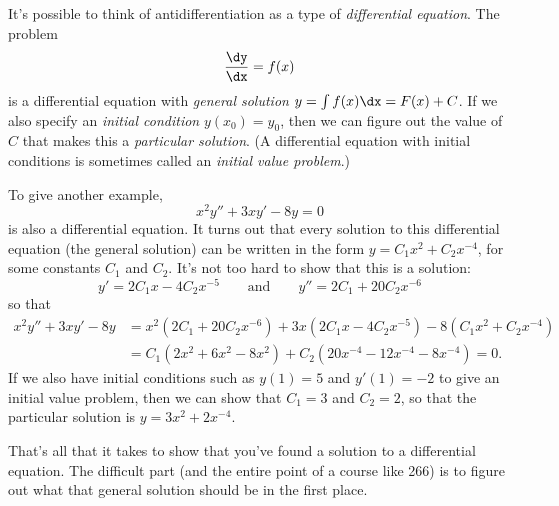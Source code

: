 

It's possible to think of antidifferentiation as a type of
\emph{differential equation}.  The problem
\[\frac\dy\dx=f(x)\]
is a differential equation with \emph{general solution}
$y=\int f(x)\dx=F(x)+C$.
If we also specify an \emph{initial condition} $y(x_0)=y_0$, then we can figure
out the value of $C$ that makes this a \emph{particular solution}.
(A differential equation with initial conditions is sometimes called an
\emph{initial value problem}.)

To give another example,
\[x^2y''+3xy'-8y=0\]
is also a differential equation.  It turns out that every solution to
this differential equation (the general solution) can be written in the form
$y=C_1x^2+C_2x^{-4}$, for some constants $C_1$ and $C_2$.
It's not too hard to show that this is a solution:
\[y'=2C_1x-4C_2x^{-5}\qquad\text{and}\qquad y''=2C_1+20C_2x^{-6}\]
so that
\begin{align*}
 x^2y''+3xy'-8y
 &=x^2(2C_1+20C_2x^{-6})+3x(2C_1x-4C_2x^{-5})-8(C_1x^2+C_2x^{-4})\\
 &=C_1(2x^2+6x^2-8x^2)+C_2(20x^{-4}-12x^{-4}-8x^{-4})=0.
\end{align*}
If we also have initial conditions such as $y(1)=5$ and $y'(1)=-2$ to give an
initial value problem, then we can
show that $C_1=3$ and $C_2=2$, so that the particular solution is
$y=3x^2+2x^{-4}$.

That's all that it takes to show that you've found a solution to a differential
equation.  The difficult part (and the entire point of a course like 266) is to
figure out what that general solution should be in the first place.
